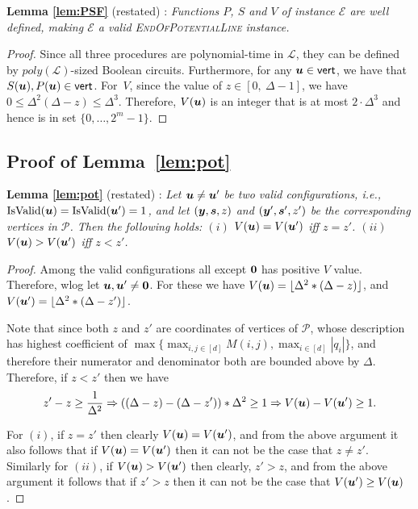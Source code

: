 \documentclass[a4paper,UKenglish]{lipics2}
\theoremstyle{definition}
\def\problem#1{\textsc{#1}}
\def\EOPL{\problem{EndOfPotentialLine}\xspace}
\def\pot{\mbox{$V$}}
\def\isvalid{\mbox{IsValid}}
\def\vert{\operatorname{\mathsf{vert}}}
\newcommand{\CPol}{\mbox{${\mathcal P}$}}
\newcommand{\CL}{\mbox{${\mathcal L}$}}
\newcommand{\CE}{\mbox{${\mathcal E}$}}
\newcommand{\yy}{\mbox{\boldmath $y$}}
\newcommand{\uu}{\mbox{\boldmath $u$}}
\newcommand{\zeros}{\mbox{\boldmath $0$}}
\newcommand{\ps}{\mbox{\boldmath $s$}}
\begin{document}
\textbf{Lemma \ref{lem:PSF}} (restated) : \emph{
Functions $P$, $S$ and $\pot$ of instance $\CE$ are well defined, making $\CE$ a valid \EOPL instance. 
}
\begin{proof}
Since all three procedures are polynomial-time in $\CL$, they can be defined
by $poly(\CL)$-sized Boolean circuits. Furthermore, for any $\uu \in \vert$,
we have that $S(\uu),P(\uu) \in \vert$. For~$\pot$, 
since the value of $z \in [0,\ \Delta-1]$, we
have $0\le \Delta^2(\Delta-z)\le \Delta^3$. Therefore, $\pot(\uu)$ is an
integer that is at most $2 \cdot \Delta^3$ and hence is in set $\{0,\dots, 2^m-1\}$. 
\end{proof}

\subsection{Proof of Lemma~\ref{lem:pot}}

\textbf{Lemma \ref{lem:pot}} (restated) : \emph{
Let $\uu \neq \uu'$ be two valid configurations, i.e.,
	$\isvalid(\uu)=\isvalid(\uu')=1$, and let $(\yy,\ps,z)$ and $(\yy',\ps',z')$
	be the corresponding vertices in $\CPol$. Then the following holds: $(i)$
	$\pot(\uu)=\pot(\uu')$ iff $z=z'$. $(ii)$ $\pot(\uu)>\pot(\uu')$ iff $z<z'$.
}
\begin{proof}
Among the valid configurations all except $\zeros$ has positive $\pot$ value. Therefore, wlog let $\uu,\uu'\neq \zeros$. For these we have $\pot(\uu)=\lfloor \Delta^2*(\Delta -z)\rfloor$, and $\pot(\uu')=\lfloor \Delta^2*(\Delta -z')\rfloor$. 

Note that since both $z$ and $z'$ are coordinates of vertices of $\CPol$, whose description has highest coefficient of $\max\{\max_{i,j\in [d]} M(i,j),\max_{i\in [d]} |q_i|\}$, and therefore their numerator and denominator both are bounded above by $\Delta$. Therefore, if $z< z'$ then we have 
\[
z'-z\ge \frac{1}{\Delta^2} \Rightarrow ((\Delta-z) - (\Delta - z'))*\Delta^2 \ge 1 \Rightarrow \pot(\uu)-\pot(\uu') \ge 1.
\]

For $(i)$, if $z=z'$ then clearly $\pot(\uu)=\pot(\uu')$, and from the above argument it also follows that if $\pot(\uu)= \pot(\uu')$ then it can not be the case that $z\neq z'$. Similarly for $(ii)$, if $\pot(\uu)>\pot(\uu')$ then clearly, $z'>z$, and from the above argument it follows that if $z'>z$ then it can not be the case that $\pot(\uu')\ge \pot(\uu)$. 
\end{proof}
\end{document}
